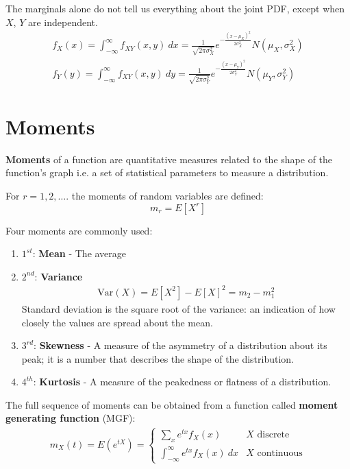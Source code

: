 \documentclass[10pt,a4paper]{article}
\begin{document}
The marginals alone do not tell us everything about the joint PDF, except when $X$, $Y$ are independent.
\begin{align*}
    f_X(x) = \int_{-\infty}^{\infty} f_{XY}(x,y)\: dx = \frac{1}{\sqrt{2\pi \sigma^2_X}}e^{-\frac{(x-\mu_X)^2}{2\sigma^2_X}} N(\mu_X, \sigma_X^2) \\
    f_Y(y) = \int_{-\infty}^{\infty} f_{XY}(x,y)\: dy = \frac{1}{\sqrt{2\pi \sigma^2_Y}}e^{-\frac{(x-\mu_Y)^2}{2\sigma^2_Y}} N(\mu_Y, \sigma_Y^2)
\end{align*}

\section{Moments}

\textbf{Moments} of a function are quantitative measures related to the shape of the function's graph
i.e. a set of statistical parameters to measure a distribution. 

For $r= 1,2,\dots$. the moments of random variables are defined:
$$
    m_r = E[X^r]
$$

Four moments are commonly used:
\begin{enumerate}
    \item $1^{st}$: \textbf{Mean} - The average
    \item $2^{nd}$: \textbf{Variance}
    \begin{align*}
        \text{Var}(X) = E[X^2] - E[X]^2 = m_2 - m_1^2
    \end{align*}
    Standard deviation is the square root of the variance: an indication of how closely the values are spread about the mean. 
    \item $3^{rd}$: \textbf{Skewness} - A measure of the asymmetry of a distribution about its peak; it is a number that describes the shape of the distribution.
    \item $4^{th}$: \textbf{Kurtosis} - A measure of the peakedness or flatness of a distribution.
\end{enumerate} 

\begin{tcolorbox}[breakable,colback=white]
    The full sequence of moments can be obtained from a function called \textbf{moment generating
    function} (MGF):
    \begin{align*}
        m_X(t) = E(e^{tX}) = 
        \begin{cases}
            \sum_x e^{tx} f_X(x) & X \text{ discrete} \\
            \int_{-\infty}^{\infty} e^{tx}f_X(x)\: dx & X \text{ continuous}
        \end{cases}
    \end{align*}
\end{tcolorbox}
\end{document}
